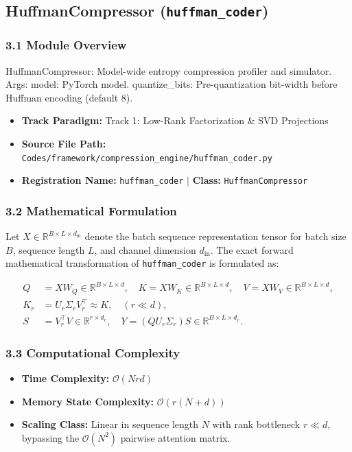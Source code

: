 \subsection{HuffmanCompressor (\texttt{huffman\_coder})}
\label{sec:app_module_huffman_coder}

\subsubsection*{3.1 Module Overview}
HuffmanCompressor: Model-wide entropy compression profiler and simulator.  Args:     model: PyTorch model.     quantize\_bits: Pre-quantization bit-width before Huffman encoding (default 8).
\begin{itemize}
    \item \textbf{Track Paradigm:} Track 1: Low-Rank Factorization & SVD Projections
    \item \textbf{Source File Path:} \texttt{Codes/framework/compression\_engine/huffman\_coder.py}
    \item \textbf{Registration Name:} \texttt{huffman\_coder} $\mid$ \textbf{Class:} \texttt{HuffmanCompressor}
\end{itemize}

\subsubsection*{3.2 Mathematical Formulation}
Let $X \in \mathbb{R}^{B \times L \times d_{\text{in}}}$ denote the batch sequence representation tensor for batch size $B$, sequence length $L$, and channel dimension $d_{\text{in}}$. The exact forward mathematical transformation of \texttt{huffman\_coder} is formulated as:

\begin{align}
Q &= X W_Q \in \mathbb{R}^{B \times L \times d}, \quad K = X W_K \in \mathbb{R}^{B \times L \times d}, \quad V = X W_V \in \mathbb{R}^{B \times L \times d}, \\
K_r &= U_r \Sigma_r V_r^\top \approx K, \quad (r \ll d), \\
S &= V_r^\top V \in \mathbb{R}^{r \times d_v}, \quad Y = (Q U_r \Sigma_r) S \in \mathbb{R}^{B \times L \times d_v}.
\end{align}


\subsubsection*{3.3 Computational Complexity}
\begin{itemize}
    \item \textbf{Time Complexity:} $\mathcal{O}(N r d)$
    \item \textbf{Memory State Complexity:} $\mathcal{O}(r(N + d))$
    \item \textbf{Scaling Class:} Linear in sequence length $N$ with rank bottleneck $r \ll d$, bypassing the $\mathcal{O}(N^2)$ pairwise attention matrix.
\end{itemize}


